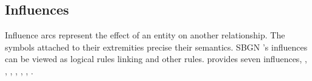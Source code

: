 




\subsection{Influences}\label{sec:influences}

Influence arcs represent the effect of an entity on another relationship. The symbols attached to their extremities precise their semantics. SBGN \ER{}'s influences can be viewed as logical rules linking  and other rules. \SBGNERLone{} provides seven influences, , , , , , , .










%

